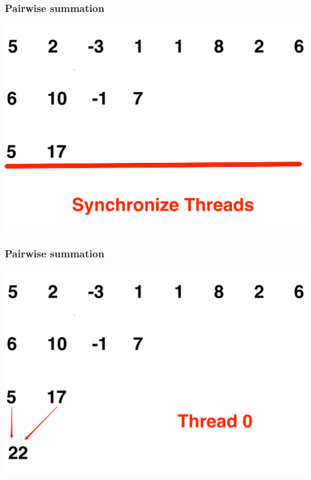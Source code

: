 \documentclass[handout]{beamer}
\numberwithin{equation}{section}
\begin{document}
\begin{frame}
\frametitle{Pairwise summation}
\includegraphics[scale=.25]{../../fig/psum8.pdf}
\end{frame}

\begin{frame}
\frametitle{Pairwise summation}
\includegraphics[scale=.25]{../../fig/psum9.pdf}
\end{frame}
\end{document}
